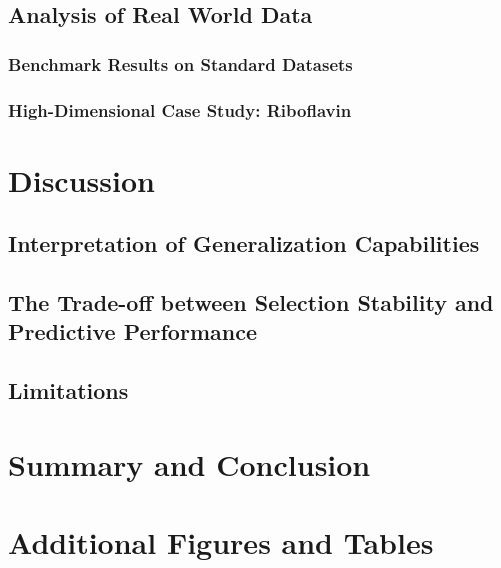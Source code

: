 \documentclass[fontsize=12 pt]{scrartcl}
\begin{document}
\subsection{Analysis of Real World Data}
\subsubsection{Benchmark Results on Standard Datasets}
\subsubsection{High-Dimensional Case Study: Riboflavin}

\newpage
\section{Discussion}
\subsection{Interpretation of Generalization Capabilities}
\subsection{The Trade-off between Selection Stability and Predictive Performance}
\subsection{Limitations}

\newpage
\section{Summary and Conclusion}

\newpage
{}
\renewcommand\refname{Bibliography} 



\newpage
\appendix 
\section{Additional Figures and Tables} 
\end{document}
